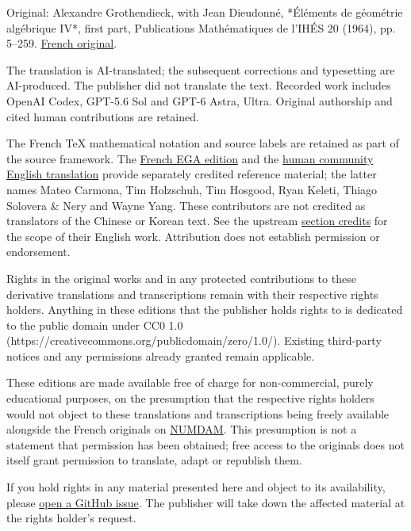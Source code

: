 \begingroup\small
Original: Alexandre Grothendieck, with Jean Dieudonné, *Éléments de géométrie algébrique IV*, first part, Publications Mathématiques de l’IHÉS 20 (1964), pp. 5–259. \href{https://numdam.org/item/PMIHES\_1964\_\_20\_\_5\_0/}{French original}.

The translation is AI-translated; the subsequent corrections and typesetting are AI-produced. The publisher did not translate the text. Recorded work includes OpenAI Codex, GPT-5.6 Sol and GPT-6 Astra, Ultra. Original authorship and cited human contributions are retained.

The French TeX mathematical notation and source labels are retained as part of the source framework. The \href{https://github.com/KokunoYumeto/ega-fr/releases/tag/ega-fr-2026-10-24-r19}{French EGA edition} and the \href{https://github.com/ryankeleti/ega/tree/3d7afe28c99d1887ccdb85acf2ca1afd93fb1971}{human community English translation} provide separately credited reference material; the latter names Mateo Carmona, Tim Holzschuh, Tim Hosgood, Ryan Keleti, Thiago Solovera \& Nery and Wayne Yang. These contributors are not credited as translators of the Chinese or Korean text. See the upstream \href{https://github.com/ryankeleti/ega/blob/3d7afe28c99d1887ccdb85acf2ca1afd93fb1971/README.md}{section credits} for the scope of their English work. Attribution does not establish permission or endorsement.

Rights in the original works and in any protected contributions to these derivative translations and transcriptions remain with their respective rights holders. Anything in these editions that the publisher holds rights to is dedicated to the public domain under CC0 1.0 (https://creativecommons.org/publicdomain/zero/1.0/). Existing third-party notices and any permissions already granted remain applicable.

These editions are made available free of charge for non-commercial, purely educational purposes, on the presumption that the respective rights holders would not object to these translations and transcriptions being freely available alongside the French originals on \href{https://www.numdam.org/journals/PMIHES/}{NUMDAM}. This presumption is not a statement that permission has been obtained; free access to the originals does not itself grant permission to translate, adapt or republish them.

If you hold rights in any material presented here and object to its availability, please \href{https://github.com/KokunoYumeto/ega-ko/issues}{open a GitHub issue}. The publisher will take down the affected material at the rights holder's request.

\par\endgroup\clearpage
